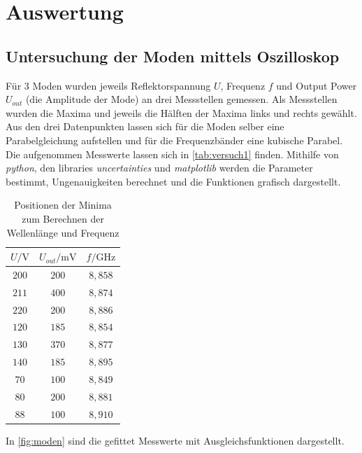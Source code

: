 \chapter{Auswertung}
\label{cha:Auswertung}

\section{Untersuchung der Moden mittels Oszilloskop}
Für 3 Moden wurden jeweils Reflektorspannung $U$, Frequenz $f$ und Output Power $U_{out}$ (die Amplitude der Mode) an drei Messstellen gemessen.
Als Messstellen wurden die Maxima und jeweils die Hälften der Maxima links und rechts gewählt.\\
Aus den drei Datenpunkten lassen sich für die Moden selber eine Parabelgleichung aufstellen und für die Frequenzbänder eine kubische Parabel.\\
Die aufgenommen Messwerte lassen sich in \autoref{tab:versuch1} finden. Mithilfe von \textit{python}, den libraries \textit{uncertainties}\cite{uncertainties} und
\textit{matplotlib}\cite{matplotlib} werden die Parameter bestimmt, Ungenauigkeiten berechnet und die Funktionen grafisch dargestellt.\\
\begin{table}[htbp] 
    \centering 
    \begin{tabular}{c c c} 
        \toprule $U / \mathrm{V}$ & $U_{out} / \mathrm{mV}$ & $f / \mathrm{GHz}$ \\ 
        \midrule 
        $200$  &  $ 200 $ &  $8,858$ \\
        $211$  &  $ 400 $ &  $8,874$ \\
        $220$  &  $ 200 $ &  $8,886$ \\
        \hline
        $120$  &  $ 185 $ &  $8,854$ \\
        $130$  &  $ 370 $ &  $8,877$ \\
        $140$  &  $ 185 $ &  $8,895 $\\
        \hline
        $70$  &  $ 100 $ &  $8,849$ \\
        $80$  &  $ 200 $ &  $8,881$ \\
        $88$  &  $ 100 $ &  $8,910$ \\
        \bottomrule 
    \end{tabular} 
    \caption[Tabelle]{Positionen der Minima zum Berechnen der Wellenlänge und Frequenz} 
    \label{tab:versuch1} 
\end{table}
In \autoref{fig:moden} sind die gefittet Messwerte mit Ausgleichsfunktionen dargestellt.
